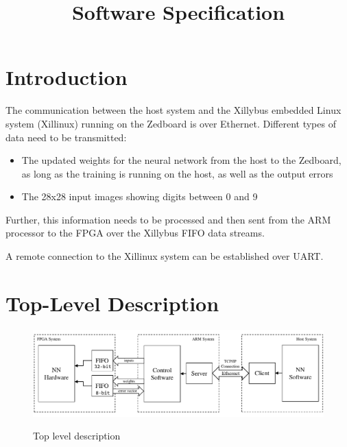 \documentclass[12pt]{article}
\title{\vspace{-2cm}Software Specification\vspace{-1cm}}
\date{}
\begin{document}
\begin{acronym}
\end{acronym}
\maketitle
\section{Introduction}
The communication between the host system and the Xillybus embedded Linux system (Xillinux) running on the Zedboard is over Ethernet. Different types of data need to be transmitted:
\begin{itemize}
	\item The updated weights for the neural network from the host to the Zedboard, as long as the training is running on the host, as well as the output errors
	\item The 28x28 input images showing digits between 0 and 9
\end{itemize}
Further, this information needs to be processed and then sent from the ARM processor to the \ac{FPGA} over the Xillybus \ac{FIFO} data streams. 

A remote connection to the Xillinux system can be established over UART.
\section{Top-Level Description}
\begin{figure}[h] 
	\centering
	{\includegraphics[scale=0.7]{img/toplevel.pdf}} 
	\caption{Top level description}
\end{figure} 
\end{document}
